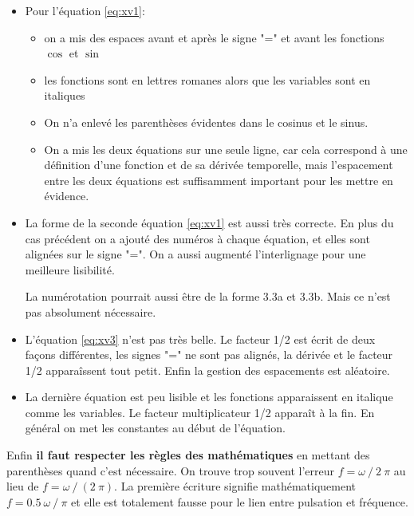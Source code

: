 \begin{itemize}
\item Pour l'équation \eqref{eq:xv1}:
	\begin{itemize}
	\item on a mis des espaces avant et après le signe "=" et avant les fonctions $\cos$ et $\sin$
    \item les fonctions sont en lettres romanes alors que les variables sont en italiques
    \item On n'a enlevé les parenthèses évidentes dans le cosinus et le sinus.	
    \item On a mis les deux équations sur une seule ligne, car cela correspond à une définition d'une fonction et de sa dérivée temporelle, mais l'espacement
    entre les deux équations est suffisamment important pour les mettre en évidence.
	\end{itemize}
\item La forme de la seconde équation \eqref{eq:xv1} est aussi très correcte.
  En plus du cas précédent on a ajouté des numéros à chaque équation, et elles sont
alignées sur le signe "=". On a aussi augmenté l'interlignage pour une meilleure lisibilité.

La numérotation pourrait aussi être de la forme 3.3a et 3.3b. Mais ce n'est pas absolument nécessaire.

\item L'équation \eqref{eq:xv3} n'est pas très belle. Le facteur 1/2 est écrit de deux façons différentes, les signes "=" ne sont pas alignés,  la dérivée 
et le facteur 1/2 apparaîssent  tout petit. Enfin la gestion des espacements est aléatoire.

\item La dernière équation est peu lisible et les fonctions apparaissent en italique comme les variables. Le facteur multiplicateur 1/2 apparaît à la fin. En général
on met les constantes au début de l'équation.
\end{itemize}


Enfin \textbf{il faut respecter les règles des mathématiques} en mettant des parenthèses quand c'est nécessaire.
 On trouve trop souvent l'erreur 
$f = \omega~/~2~\pi$ au lieu de $f = \omega~/~(2~\pi)$. La première écriture signifie mathématiquement $f = 0.5~\omega~/~\pi$
et elle est totalement fausse pour le lien entre pulsation et fréquence. 




